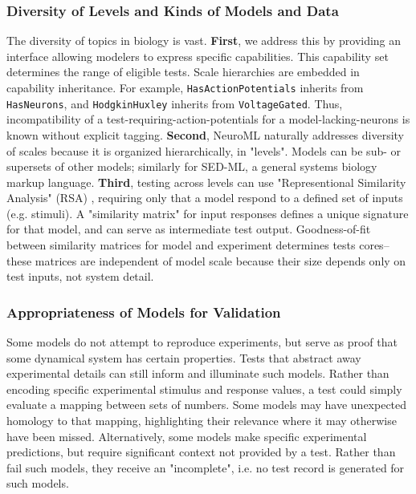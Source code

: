 \documentclass[11pt,letterpaper]{article}
\let\verbx\lstinline
\begin{document}
\subsubsection{Diversity of Levels and Kinds of Models and Data}
The diversity of topics in biology is vast. \textbf{First}, we address this by providing an interface allowing modelers to express specific capabilities.  This capability set determines the range of eligible tests.  Scale hierarchies are embedded in capability inheritance.  For example, \verbx{HasActionPotentials} inherits from \verbx{HasNeurons}, and \verbx{HodgkinHuxley} inherits from \verbx{VoltageGated}. Thus, incompatibility of a test-requiring-action-potentials for a model-lacking-neurons is known without explicit tagging. \textbf{Second}, NeuroML naturally addresses diversity of scales because it is organized hierarchically, in "levels".  Models can be sub- or supersets of other models; similarly for SED-ML\cite{sedml_url,hucka_systems_2003}, a general systems biology markup language. \textbf{Third}, testing across levels can use "Representional Similarity Analysis" (RSA) \cite{kriegeskorte_representational_2008}, requiring only that a model respond to a defined set of inputs (e.g. stimuli).  A "similarity matrix" for input responses defines a unique signature for that model, and can serve as intermediate test output.  Goodness-of-fit between similarity matrices for model and experiment determines tests cores-- these matrices are independent of model scale because their size depends only on test inputs, not system detail.  

\subsubsection{Appropriateness of Models for Validation}
Some models do not attempt to reproduce experiments, but serve as proof that some dynamical system has certain properties.  Tests that abstract away experimental details can still inform and illuminate such models.  Rather than encoding specific experimental stimulus and response values, a test could simply evaluate a mapping between sets of numbers.  Some models may have unexpected homology to that mapping, highlighting their relevance where it may otherwise have been missed.  Alternatively, some models make specific experimental predictions, but require significant context not provided by a test.  Rather than fail such models, they receive an "incomplete", i.e. no test record is generated for such models.  
\end{document}
